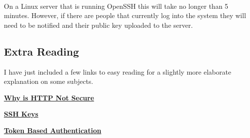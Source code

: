 \paragraph{}
On a Linux server that is running OpenSSH this will take no longer than 5 minutes.
However, if there are people that currently log into the system they will need to be notified and their public key uploaded to the server.

\subsection{Extra Reading}\label{subsec:extra-reading}
I have just included a few links to easy reading for a slightly more elaborate explanation on some subjects.

\begin{description}
    \item \href{https://www.cloudflare.com/en-au/learning/ssl/why-is-http-not-secure/}{\textbf{Why is HTTP Not Secure}}
    \item \href{https://wiki.archlinux.org/title/SSH_keys}{\textbf{SSH Keys}}
    \item \href{https://www.okta.com/identity-101/what-is-token-based-authentication/}{\textbf{Token Based Authentication}}
\end{description}
